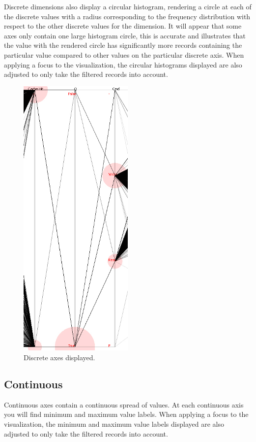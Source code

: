 \documentclass[12pt]{ucthesis}
\begin{document}
Discrete dimensions also display a circular histogram, rendering a circle at each of the discrete values with a radius corresponding to the frequency distribution with respect to the other discrete values for the dimension. It will appear that some axes only contain one large histogram circle, this is accurate and illustrates that the value with the rendered circle has significantly more records containing the particular value compared to other values on the particular discrete axis. When applying a focus to the visualization, the circular histograms displayed are also adjusted to only take the filtered records into account.

\begin{figure}[htb!]
 \centering
 \includegraphics[width=0.5\textwidth]{images/documentation/discrete.jpg}
 \caption[Discrete axes displayed.]{Discrete axes displayed.}
 \label{fig:doc}
\end{figure}

\subsection{Continuous}
Continuous axes contain a continuous spread of values. At each continuous axis you will find minimum and maximum value labels. When applying a focus to the visualization, the minimum and maximum value labels displayed are also adjusted to only take the filtered records into account.
\end{document}
